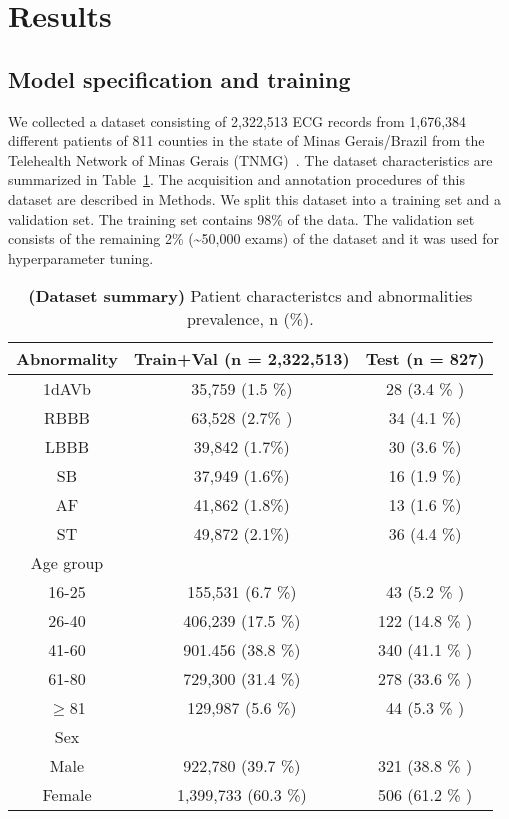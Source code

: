 \documentclass{article}
\begin{document}
\section{Results}

\subsection{Model specification and training}

We collected a dataset consisting of 2,322,513 ECG records from 1,676,384 different patients of 811 counties in the state of Minas Gerais/Brazil from the  Telehealth Network of Minas Gerais (TNMG)~\cite{alkmim_improving_2012}. The dataset characteristics are summarized in Table~\ref{tab:diagnosis}. The acquisition and annotation procedures of this dataset are described in Methods. We split this dataset into a training set and a validation set. The training set contains 98\% of the data. The validation set consists of the remaining 2\% (\textasciitilde 50,000 exams) of the dataset and it was used for hyperparameter tuning. 

\begin{table}[h]
  \centering
  \begin{tabular}{ccc}
    \hline
    \rowcolor[gray]{0.9} Abnormality & Train+Val (n = 2,322,513) & Test (n = 827)\\
    \hline
    1dAVb  &   35,759  (1.5 \%) &  28 (3.4 \% )\\
    RBBB &  63,528 (2.7\% ) &  34 (4.1 \%)\\
    LBBB & 39,842  (1.7\%) &  30 (3.6 \%)\\
    SB & 37,949 (1.6\%) & 16 (1.9 \%)\\
    AF &  41,862 (1.8\%) &  13 (1.6 \%)\\
    ST & 49,872 (2.1\%) &  36 (4.4 \%) \\
    \hline
    \rowcolor[gray]{0.9} Age group & & \\
    16-25 & 155,531  (6.7 \%) &  43 (5.2 \% )\\
    26-40 & 406,239  (17.5 \%)  &  122 (14.8 \% )\\
    41-60 & 901.456  (38.8 \%) &  340 (41.1 \% )\\
    61-80 & 729,300 (31.4 \%) &  278 (33.6 \% )\\
    $\ge$81 &  129,987 (5.6 \%) &  44 (5.3 \% )\\
    \hline
    \rowcolor[gray]{0.9} Sex & & \\
    Male & 922,780  (39.7 \%) &  321 (38.8 \% )\\
    Female &  1,399,733  (60.3 \%) &  506 (61.2 \% ) \\
    \hline
    \hline
    \end{tabular}
  \caption{\textbf{(Dataset summary)} Patient characteristcs and abnormalities prevalence, n (\%).}
  \label{tab:diagnosis}
\end{table}
\end{document}
